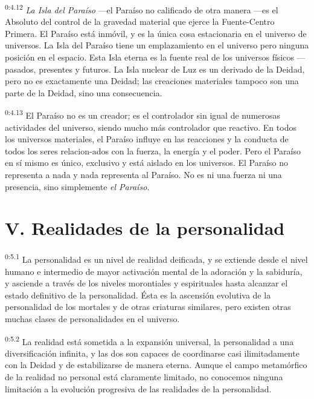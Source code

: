 \par
\textsuperscript{0:4.12} \textit{La Isla del Paraíso} ---el Paraíso no calificado de otra manera ---es el Absoluto del control de la gravedad material que ejerce la Fuente-Centro Primera. El Paraíso está inmóvil, y es la única cosa estacionaria en el universo de universos. La Isla del Paraíso tiene un emplazamiento en el universo pero ninguna posición en el espacio. Esta Isla eterna es la fuente real de los universos físicos ---pasados, presentes y futuros. La Isla nuclear de Luz es un derivado de la Deidad, pero no es exactamente una Deidad; las creaciones materiales tampoco son una parte de la Deidad, sino una consecuencia.

\par
\textsuperscript{0:4.13} El Paraíso no es un creador; es el controlador sin igual de numerosas actividades del universo, siendo mucho más controlador que reactivo. En todos los universos materiales, el Paraíso influye en las reacciones y la conducta de todos los seres relacion-ados con la fuerza, la energía y el poder. Pero el Paraíso en sí mismo es único, exclusivo y está aislado en los universos. El Paraíso no representa a nada y nada representa al Paraíso. No es ni una fuerza ni una presencia, sino simplemente \textit{el Paraíso.}

\section*{V. Realidades de la personalidad}
\par
\textsuperscript{0:5.1} La personalidad es un nivel de realidad deificada, y se extiende desde el nivel humano e intermedio de mayor activación mental de la adoración y la sabiduría, y asciende a través de los niveles morontiales y espirituales hasta alcanzar el estado definitivo de la personalidad. Ésta es la ascensión evolutiva de la personalidad de los mortales y de otras criaturas similares, pero existen otras muchas clases de personalidades en el universo.

\par
\textsuperscript{0:5.2} La realidad está sometida a la expansión universal, la personalidad a una diversificación infinita, y las dos son capaces de coordinarse casi ilimitadamente con la Deidad y de estabilizarse de manera eterna. Aunque el campo metamórfico de la realidad no personal está claramente limitado, no conocemos ninguna limitación a la evolución progresiva de las realidades de la personalidad.

